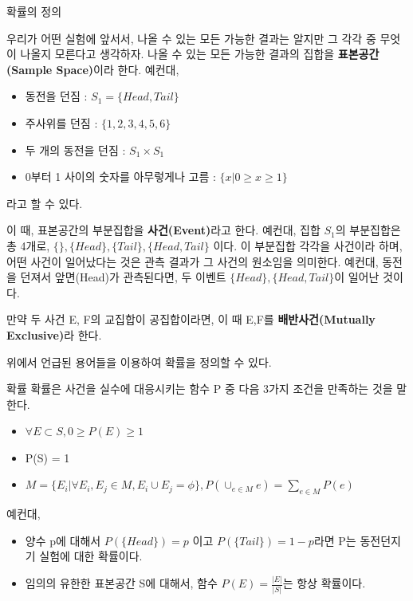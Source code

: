 \documentclass{beamer}
\begin{document}
\begin{frame}[allowframebreaks]{확률의 정의}

우리가 어떤 실험에 앞서서, 나올 수 있는 모든 가능한 결과는 알지만 그 각각 중 무엇이 나올지 모른다고 생각하자. 나올 수 있는 모든 가능한 결과의 집합을 \textbf{표본공간(Sample Space)}이라 한다. 예컨대, 

\begin{itemize} 
\item 동전을 던짐 : $S_1 = \{Head, Tail\}$
\item 주사위를 던짐 : $\{1,2,3,4,5,6\}$
\item 두 개의 동전을 던짐 : $S_1 \times S_1$
\item 0부터 1 사이의 숫자를 아무렇게나 고름 : $\{x|0 \geq x \geq 1\}$
\end{itemize}

라고 할 수 있다. 

\framebreak 

이 때, 표본공간의 부분집합을 \textbf{사건(Event)}라고 한다. 예컨대, 집합 $S_1$의 부분집합은 총 4개로, $\{\}, \{Head\}, \{Tail\}, \{Head, Tail\}$ 이다. 이 부분집합 각각을 사건이라 하며, 어떤 사건이 일어났다는 것은 관측 결과가 그 사건의 원소임을 의미한다. 예컨대, 동전을 던져서 앞면(Head)가 관측된다면, 두 이벤트 $\{Head\}, \{Head, Tail\}$이 일어난 것이다. 

만약 두 사건 E, F의 교집합이 공집합이라면, 이 때 E,F를 \textbf{배반사건(Mutually Exclusive)}라 한다. 

\framebreak

위에서 언급된 용어들을 이용하여 확률을 정의할 수 있다. 

\begin{block}{확률}
확률은 사건을 실수에 대응시키는 함수 P 중 다음 3가지 조건을 만족하는 것을 말한다. 

\begin{itemize} 
\item $\forall E \subset S, 0 \geq P(E) \geq 1$
\item P(S) = 1
\item $M = \{E_i| \forall E_i, E_j \in M,  E_i \cup E_j = \phi\}, P(\cup_{e \in M} e) = \sum_{e \in M} P(e)$
\end{itemize}
\end{block}

예컨대, 

\begin{itemize} 
\item 양수 p에 대해서 $P(\{Head\})=p$ 이고 $P(\{Tail\})=1-p$라면 P는 동전던지기 실험에 대한 확률이다. 
\item 임의의 유한한 표본공간 S에 대해서, 함수 $P(E) = \frac{|E|}{|S|}$는 항상 확률이다. 
\end{itemize}
 
\end{frame}
\end{document}
